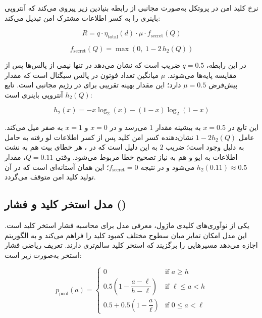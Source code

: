 نرخ کلید امن در پروتکل  به‌صورت مجانبی از رابطه بنیادین زیر پیروی می‌کند که آنتروپی باینری  را به کسر اطلاعات مشترک امن تبدیل می‌کند:

\begin{equation}
	R = q \cdot \eta_{\text{total}}(d) \cdot \mu \cdot f_{\text{secret}}(Q)
\end{equation}

\begin{equation}
	f_{\text{secret}}(Q) = \max\left(0,\; 1 - 2 \, h_2(Q)\right)
\end{equation}

در این رابطه، $q = 0.5$ ضریب  است که نشان می‌دهد در  تنها نیمی از پالس‌ها پس از مقایسه پایه‌ها  می‌شوند. $\mu$ میانگین تعداد فوتون در پالس سیگنال است که مقدار پیش‌فرض $\mu = 0.5$ دارد؛ این مقدار بهینه تقریبی برای  در رژیم مجانبی است. تابع $h_2(Q)$ آنتروپی باینری است:

\begin{equation}
	h_2(x) = -x \log_2(x) - (1-x) \log_2(1-x)
\end{equation}

این تابع در $x = 0.5$ به بیشینه مقدار $1$ می‌رسد و در $x = 0$ و $x = 1$ به صفر میل می‌کند. عامل $1 - 2 h_2(Q)$ نشان‌دهنده کسر امن کلید پس از کسر اطلاعات لو رفته به حامل به دلیل وجود  است؛ ضریب $2$ به این دلیل است که در ، هر خطای بیت هم به نشت اطلاعات به ایو و هم به نیاز تصحیح خطا مربوط می‌شود. وقتی $Q = 0.11$، مقدار $h_2(0.11) \approx 0.5$ می‌شود و در نتیجه $f_{\text{secret}} = 0$؛ این همان آستانه‌ای است که در آن تولید کلید امن متوقف می‌گردد.

\subsection{مدل استخر کلید و فشار ()}

یکی از نوآوری‌های کلیدی ماژول، معرفی مدل  برای محاسبه فشار استخر کلید است. این مدل امکان تمایز میان سطوح مختلف کمبود کلید را فراهم می‌کند و به الگوریتم  اجازه می‌دهد مسیرهایی را برگزیند که استخر کلید سالم‌تری دارند. تعریف ریاضی فشار استخر به‌صورت زیر است:

\begin{equation}
	p_{\text{pool}}(a) = \begin{cases} 0 & \text{if } a \geq h \\ 0.5 \left(1 - \dfrac{a - \ell}{h - \ell}\right) & \text{if } \ell \leq a < h \\ 0.5 + 0.5 \left(1 - \dfrac{a}{\ell}\right) & \text{if } 0 \leq a < \ell \end{cases}
\end{equation}

